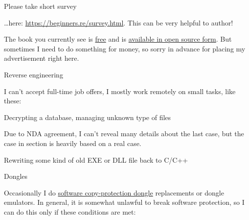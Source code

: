 \vspace*{\fill}

\huge
	Please take short survey
\normalsize

\bigskip
\bigskip
\bigskip

\dots here: \url{https://beginners.re/survey.html}.
This can be very helpful to author!

\bigskip
\bigskip
\bigskip

\huge
\normalsize

\bigskip
\bigskip
\bigskip


The book you currently see is \href{http://beginners.re/}{free} and is \href{https://github.com/dennis714/RE-for-beginners/}{available in open source form}.
But sometimes I need to do something for money, so sorry in advance for placing my advertisement right here.

\iffalse
\Large Need documentation? \normalsize

I could try to write a documentation/reference/manual for some API, language, framework, etc.

Sometimes I'm good at finding concise and clear example for each API/language feature.
This book is an example of it.
I can try to do this in long and steady fashion.

On the other side, my English is far from fluent.
And I may need a long time for diving deep into product unknown to me.

But I'll glad to rework existing documentation project.

Example of reference I admire is Wolfram Mathematica one: \url{http://reference.wolfram.com/language/}.
\fi

\Large Reverse engineering \normalsize

I can't accept full-time job offers, I mostly work remotely on small tasks, like these:

\large Decrypting a database, managing unknown type of files \normalsize

Due to NDA agreement, I can't reveal many details about the last case, but the case in  section
is heavily based on a real case.

\large Rewriting some kind of old EXE or DLL file back to C/C++ \normalsize

\large Dongles \normalsize

Occasionally I do \href{https://en.wikipedia.org/wiki/Software_protection_dongle}{software copy-protection dongle} replacements or dongle emulators. In general, it is somewhat unlawful to break software protection, so I can do this only if these conditions are met:


